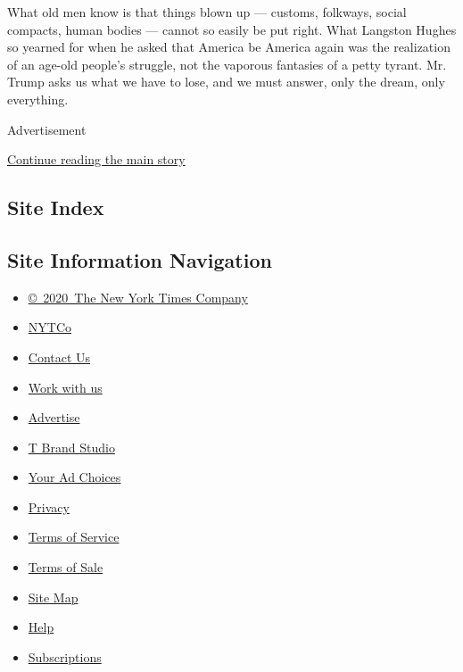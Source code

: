 What old men know is that things blown up --- customs, folkways, social
compacts, human bodies --- cannot so easily be put right. What Langston
Hughes so yearned for when he asked that America be America again was
the realization of an age-old people's struggle, not the vaporous
fantasies of a petty tyrant. Mr. Trump asks us what we have to lose, and
we must answer, only the dream, only everything.

Advertisement

\protect\hyperlink{after-bottom}{Continue reading the main story}

\hypertarget{site-index}{%
\subsection{Site Index}\label{site-index}}

\hypertarget{site-information-navigation}{%
\subsection{Site Information
Navigation}\label{site-information-navigation}}

\begin{itemize}
\tightlist
\item
  \href{https://help.nytimes3xbfgragh.onion/hc/en-us/articles/115014792127-Copyright-notice}{©~2020~The
  New York Times Company}
\end{itemize}

\begin{itemize}
\tightlist
\item
  \href{https://www.nytco.com/}{NYTCo}
\item
  \href{https://help.nytimes3xbfgragh.onion/hc/en-us/articles/115015385887-Contact-Us}{Contact
  Us}
\item
  \href{https://www.nytco.com/careers/}{Work with us}
\item
  \href{https://nytmediakit.com/}{Advertise}
\item
  \href{http://www.tbrandstudio.com/}{T Brand Studio}
\item
  \href{https://www.nytimes3xbfgragh.onion/privacy/cookie-policy\#how-do-i-manage-trackers}{Your
  Ad Choices}
\item
  \href{https://www.nytimes3xbfgragh.onion/privacy}{Privacy}
\item
  \href{https://help.nytimes3xbfgragh.onion/hc/en-us/articles/115014893428-Terms-of-service}{Terms
  of Service}
\item
  \href{https://help.nytimes3xbfgragh.onion/hc/en-us/articles/115014893968-Terms-of-sale}{Terms
  of Sale}
\item
  \href{https://spiderbites.nytimes3xbfgragh.onion}{Site Map}
\item
  \href{https://help.nytimes3xbfgragh.onion/hc/en-us}{Help}
\item
  \href{https://www.nytimes3xbfgragh.onion/subscription?campaignId=37WXW}{Subscriptions}
\end{itemize}
